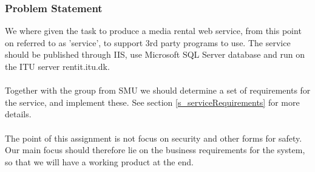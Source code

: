 \subsubsection{Problem Statement}
We where given the task to produce a media rental web service, from this point on referred to as 'service', to support 3rd party programs to use. The service should be published through IIS, use Microsoft SQL Server database and run on the ITU server rentit.itu.dk.
\\\\
Together with the group from SMU we should determine a set of requirements for the service, and implement these. See section \ref{s_serviceRequirements} for more details.
\\\\
The point of this assignment is not focus on security and other forms for safety. Our main focus should therefore lie on the business requirements for the system, so that we will have a working product at the end.
\newpage